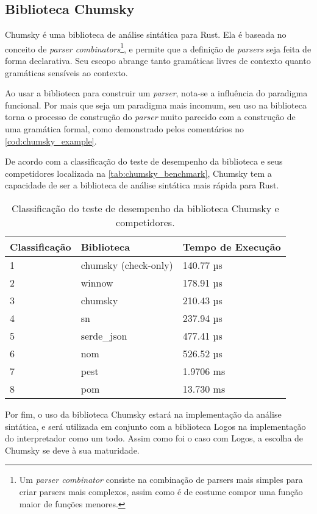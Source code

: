 \subsection{Biblioteca Chumsky}

Chumsky é uma biblioteca de análise sintática para Rust. Ela é baseada no conceito de \textit{parser combinators}\footnote{Um \textit{parser combinator} consiste na combinação de parsers mais simples para criar parsers mais complexos, assim como é de costume compor uma função maior de funções menores.}, e permite que a definição de \textit{parsers} seja feita de forma declarativa. Seu escopo abrange tanto gramáticas livres de contexto quanto gramáticas sensíveis ao contexto.

Ao usar a biblioteca para construir um \textit{parser}, nota-se a influência do paradigma funcional. Por mais que seja um paradigma mais incomum, seu uso na biblioteca torna o processo de construção do \textit{parser} muito parecido com a construção de uma gramática formal, como demonstrado pelos comentários no \autoref{cod:chumsky_example}.

\codigoRust

\vspace{-1em}

De acordo com a classificação do teste de desempenho da biblioteca e seus competidores localizada na \autoref{tab:chumsky_benchmark}, Chumsky tem a capacidade de ser a biblioteca de análise sintática mais rápida para Rust.

\FloatBarrier

\begin{table}[H]
	\centering
	\caption{Classificação do teste de desempenho da biblioteca Chumsky e competidores.}
	{
		\begin{tabular}{lll}
			\hline
			\textbf{Classificação} & \textbf{Biblioteca}  & \textbf{Tempo de Execução} \\ \hline
			1                      & chumsky (check-only) & 140.77 µs                  \\
			2                      & winnow               & 178.91 µs                  \\
			3                      & chumsky              & 210.43 µs                  \\
			4                      & sn                   & 237.94 µs                  \\
			5                      & serde\_json          & 477.41 µs                  \\
			6                      & nom                  & 526.52 µs                  \\
			7                      & pest                 & 1.9706 ms                  \\
			8                      & pom                  & 13.730 ms                  \\ \hline
		\end{tabular}
	}
	\label{tab:chumsky_benchmark}
\end{table}

Por fim, o uso da biblioteca Chumsky estará na implementação da análise sintática, e será utilizada em conjunto com a biblioteca Logos na implementação do interpretador como um todo. Assim como foi o caso com Logos, a escolha de Chumsky se deve à sua maturidade.
